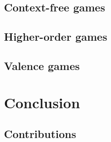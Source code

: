 \documentclass%
[%
    a4paper,                 %
    11pt,                    %
    parskip=half-,           %
    numbers=noenddot,        %
    twoside,                 %
    fleqn,                   %
    toc=chapterentrywithdots,%
    cleardoublepage=plain,   %
]
{style/smbook}
\begin{document}
    \chapter{Context-free games}%
    \label{Chapter:ContextFreeGames}%
    \chaptertoc%
        
        
        \clearpage
        
        \clearpage
        
        \clearpage
        
        \clearpage
        
        \clearpage
        
        \clearpage
        
        \clearpage
        
        \clearpage
        

    \chapter{Higher-order games}%
    \label{Chapter:HOGames}%
    \chaptertoc%
        
        
        \clearpage
        
        \clearpage
        
        \clearpage
        
        \clearpage
        

    \chapter{Valence games}%
    \label{Chapter:ValenceGames}%
    \chaptertoc%
        
        \clearpage
        
        \clearpage
        
        \clearpage
        


\part{Conclusion}%
\label{Part:Conclusion}%

    \chapter{Contributions}%
    \label{Chapter:Contributions}%
    
\end{document}
